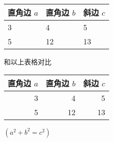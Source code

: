 \documentclass[UTF8]{ctexart}%
\begin{document}
\begin{tabular}{|lll|}        %
     \hline
     直角边 $a$ & 直角边 $b$ & 斜边 $c$ \\  %
     \hline
     3 & 4 & 5 \\
     5 & 12 & 13 \\
     \hline
\end{tabular}

和以上表格对比

\begin{table}[H]         %
     \begin{tabular}{|rrr|}
          \hline
          直角边 $a$ & 直角边 $b$ & 斜边 $c$ \\  
          \hline
          3 & 4 & 5 \\
          5 & 12 & 13 \\
          \hline 
          \end{tabular}
          \qquad        %
          $(a^2+b^2=c^2)$
\end{table}    



\end{document}
